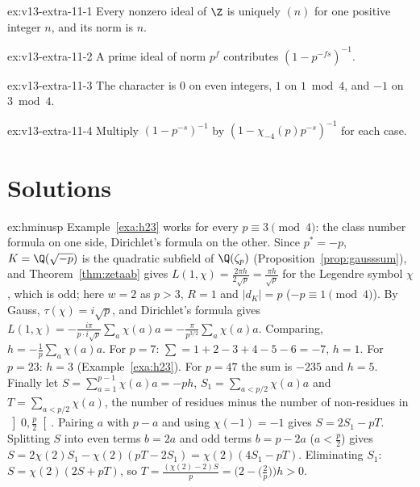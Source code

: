 \begin{hint}{ex:v13-extra-11-1}
Every nonzero ideal of $\Z$ is uniquely $(n)$ for one positive integer $n$, and its norm is $n$.
\end{hint}

\begin{hint}{ex:v13-extra-11-2}
A prime ideal of norm $p^f$ contributes $(1-p^{-fs})^{-1}$.
\end{hint}

\begin{hint}{ex:v13-extra-11-3}
The character is $0$ on even integers, $1$ on $1\bmod4$, and $-1$ on $3\bmod4$.
\end{hint}

\begin{hint}{ex:v13-extra-11-4}
Multiply $(1-p^{-s})^{-1}$ by $(1-\chi_{-4}(p)p^{-s})^{-1}$ for each case.
\end{hint}

\section{Solutions}

\begin{solution}{ex:hminusp}
\idea Example~\ref{exa:h23} works for every $p\equiv3\pmod4$: the class number formula on one side, Dirichlet's formula on the other.
\writeup Since $p^*=-p$, $K=\Q(\sqrt{-p})$ is the quadratic subfield of $\Q(\zeta_p)$ (Proposition~\ref{prop:gausssum}), and Theorem~\ref{thm:zetaab}
gives $L(1,\chi)=\frac{2\pi h}{2\sqrt p}=\frac{\pi h}{\sqrt p}$ for the Legendre symbol $\chi$, which is odd; here $w=2$ as $p>3$, $R=1$ and $|d_K|=p$
($-p\equiv1\pmod4$). By Gauss, $\tau(\chi)=i\sqrt p$, and Dirichlet's formula gives $L(1,\chi)=-\frac{i\pi}{p\cdot i\sqrt p}\sum_a\chi(a)a=
-\frac\pi{p^{3/2}}\sum_a\chi(a)a$. Comparing, $h=-\frac1p\sum_a\chi(a)a$. For $p=7$: $\sum=1+2-3+4-5-6=-7$, $h=1$. For $p=23$: $h=3$
(Example~\ref{exa:h23}). For $p=47$ the sum is $-235$ and $h=5$. Finally let $S=\sum_{a=1}^{p-1}\chi(a)a=-ph$, $S_1=\sum_{a<p/2}\chi(a)a$ and
$T=\sum_{a<p/2}\chi(a)$, the number of residues minus the number of non-residues in $\left]0,\frac p2\right[$. Pairing $a$ with $p-a$ and using
$\chi(-1)=-1$ gives $S=2S_1-pT$. Splitting $S$ into even terms $b=2a$ and odd terms $b=p-2a$ ($a<\frac p2$) gives $S=2\chi(2)S_1-\chi(2)(pT-2S_1)
=\chi(2)(4S_1-pT)$. Eliminating $S_1$: $S=\chi(2)(2S+pT)$, so $T=\frac{(\chi(2)-2)S}p=\bigl(2-\bigl(\frac2p\bigr)\bigr)h>0$.
\end{solution}

